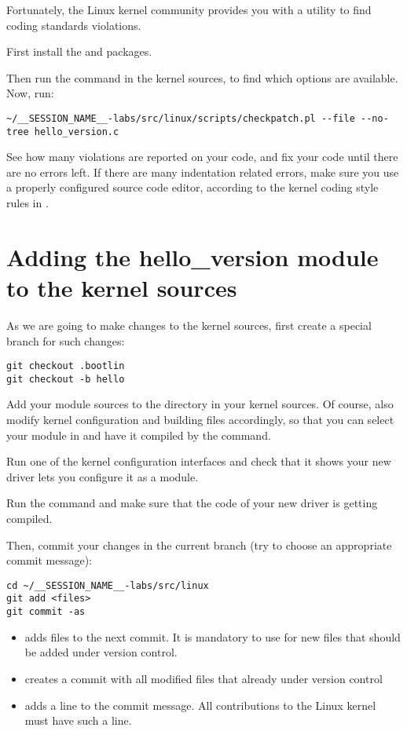 Fortunately, the Linux kernel community provides you with a utility to
find coding standards violations.

First install the  and  packages.

Then run the  command in the kernel sources,
to find which options are available.  Now, run:

\begin{verbatim}
~/__SESSION_NAME__-labs/src/linux/scripts/checkpatch.pl --file --no-tree hello_version.c
\end{verbatim}

See how many violations are reported on your code, and fix your code
until there are no errors left. If there are many indentation related
errors, make sure you use a properly configured source code editor,
according to the kernel coding style rules in
.

\section{Adding the hello\_version module to the kernel sources}

As we are going to make changes to the kernel sources, first create a
special branch for such changes:

\texttt{git checkout \workingkernel.bootlin\\git checkout -b hello}

Add your module sources to the  directory in your
kernel sources. Of course, also modify kernel configuration and
building files accordingly, so that you can select your module in
 and have it compiled by the  command.

Run one of the kernel configuration interfaces and check that it
shows your new driver lets you configure it as a module.

Run the  command and make sure that the code of your new
driver is getting compiled.

Then, commit your changes in the current branch (try to choose an
appropriate commit message):

\begin{verbatim}
cd ~/__SESSION_NAME__-labs/src/linux
git add <files>
git commit -as
\end{verbatim}

\begin{itemize}
\item {} adds files to the next commit. It is mandatory to
  use for new files that should be added under version control.
\item {} creates a commit with all modified files
  that already under version control
\item {} adds a  line to the
      commit message. All contributions to the Linux kernel must have
      such a line.
\end{itemize}

